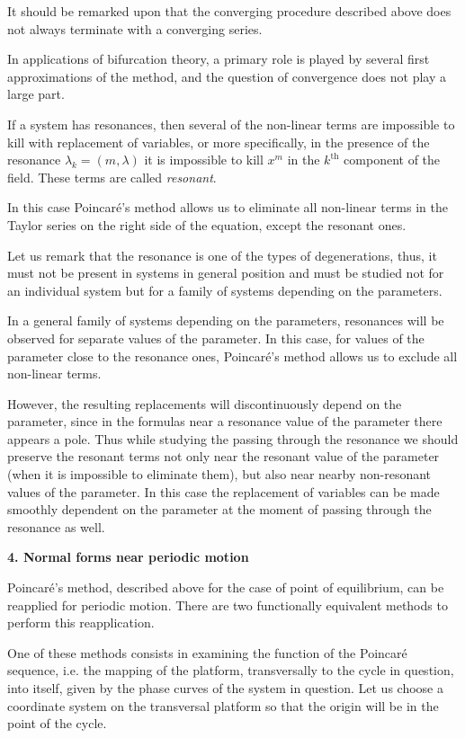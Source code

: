 \documentclass[12pt]{amsart}
\begin{document}
It should be remarked upon that the converging procedure described above does
not always terminate with a converging series.

In applications of bifurcation theory, a primary role is played by several first
approximations of the method, and the question of convergence does not play a
large part.

If a system has resonances, then several of the non-linear terms are impossible
to kill with replacement of variables, or more specifically, in the presence of
the resonance $\lambda_k=(m,\lambda)$ it is impossible to kill $x^m$ in the
$k^\text{th}$ component of the field.
These terms are called \textit{resonant}.

In this case Poincar\'e's method allows us to eliminate all non-linear terms in
the Taylor series on the right side of the equation, except the resonant ones.

Let us remark that the resonance is one of the types of degenerations, thus, it
must not be present in systems in general position and must be studied not for
an individual system but for a family of systems depending on the parameters.

In a general family of systems depending on the parameters, resonances will be
observed for separate values of the parameter.
In this case, for values of the parameter close to the resonance ones,
Poincar\'e's method allows us to exclude all non-linear terms.

However, the resulting replacements will discontinuously depend on the
parameter, since in the formulas near a resonance value of the parameter there
appears a pole.
Thus while studying the passing through the resonance we should preserve the
resonant terms not only near the resonant value of the parameter (when it is
impossible to eliminate them), but also near nearby non-resonant values of the
parameter.
In this case the replacement of variables can be made smoothly dependent on the
parameter at the moment of passing through the resonance as well.\\

\centerline{\textbf{4. Normal forms near periodic motion}}
\vspace{1em}
Poincar\'e's method, described above for the case of point of equilibrium, can
be reapplied for periodic motion.
There are two functionally equivalent methods to perform this reapplication.

One of these methods consists in examining the function of the Poincar\'e
sequence, i.e. the mapping of the platform, transversally to the cycle in
question, into itself, given by the phase curves of the system in question.
Let us choose a coordinate system on the transversal platform so that the origin
will be in the point of the cycle.
\end{document}
